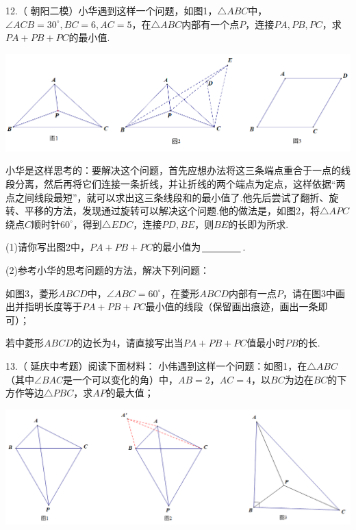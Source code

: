 \documentclass[10pt]{ctexart}
\begin{document}
\vspace{1cm}

\begin{shaded}
12.（ 朝阳二模）小华遇到这样一个问题，如图1，$\triangle ABC$中，$\angle ACB=30^\circ,BC=6,AC=5$，在$\triangle ABC$内部有一个点$P$，连接$PA,PB,PC$，求$PA+PB+PC$的最小值.
\end{shaded}

\begin{center}
	\includegraphics[scale=0.5]{figure/feimadian23}
\end{center}

\begin{shaded}
小华是这样思考的：要解决这个问题，首先应想办法将这三条端点重合于一点的线段分离，然后再将它们连接一条折线，并让折线的两个端点为定点，这样依据“两点之间线段最短”，就可以求出这三条线段和的最小值了.他先后尝试了翻折、旋转、平移的方法，发现通过旋转可以解决这个问题.他的做法是，如图2，将$\triangle APC$绕点$C$顺时针$60^\circ$，得到$\triangle EDC$，连接$PD,BE$，则$BE$的长即为所求.

(1)请你写出图2中，$PA+PB+PC$的最小值为$\underline{\hspace{1.5cm}}$.

(2)参考小华的思考问题的方法，解决下列问题：

如图3，菱形$ABCD$中，$\angle ABC=60^\circ$，在菱形$ABCD$内部有一点$P$，请在图3中画出并指明长度等于$PA+PB+PC$最小值的线段（保留画出痕迹，画出一条即可）；

若中菱形$ABCD$的边长为4，请直接写出当$PA+PB+PC$值最小时$PB$的长.
\end{shaded}

\vspace{1cm}

\begin{shaded}
13.（ 延庆中考题）阅读下面材料：
小伟遇到这样一个问题：如图1，在$\triangle ABC$（其中$\angle BAC$是一个可以变化的角）中，$AB=2$，$AC=4$，以$BC$为边在$BC$的下方作等边$\triangle PBC$，求$AP$的最大值；
\end{shaded}

\begin{center}
	\includegraphics[scale=0.5]{figure/feimadian24}
\end{center}
\end{document}
